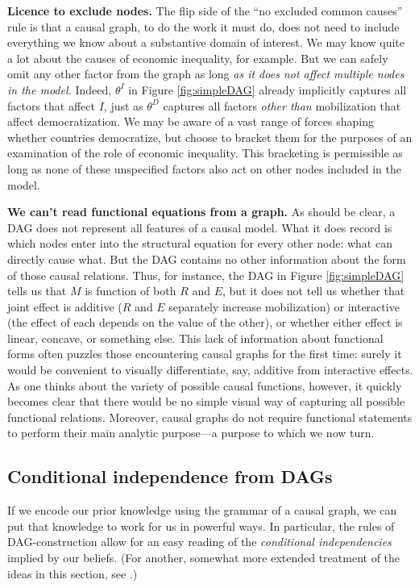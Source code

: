 \documentclass[
  12pt,
]{book}
\begin{document}
\textbf{Licence to exclude nodes.} The flip side of the ``no excluded common causes'' rule is that a causal graph, to do the work it must do, does not need to include everything we know about a substantive domain of interest. We may know quite a lot about the causes of economic inequality, for example. But we can safely omit any other factor from the graph as long \emph{as it does not affect multiple nodes in the model.} Indeed, \(\theta^I\) in Figure \ref{fig:simpleDAG} already implicitly captures all factors that affect \(I\), just as \(\theta^D\) captures all factors \emph{other than} mobilization that affect democratization. We may be aware of a vast range of forces shaping whether countries democratize, but choose to bracket them for the purposes of an examination of the role of economic inequality. This bracketing is permissible as long as none of these unspecified factors also act on other nodes included in the model.

\textbf{We can't read functional equations from a graph.} As should be clear, a DAG does not represent all features of a causal model. What it does record is which nodes enter into the structural equation for every other node: what can directly cause what. But the DAG contains no other information about the form of those causal relations. Thus, for instance, the DAG in Figure \ref{fig:simpleDAG} tells us that \(M\) is function of both \(R\) and \(E\), but it does not tell us whether that joint effect is additive (\(R\) and \(E\) separately increase mobilization) or interactive (the effect of each depends on the value of the other), or whether either effect is linear, concave, or something else. This lack of information about functional forms often puzzles those encountering causal graphs for the first time: surely it would be convenient to visually differentiate, say, additive from interactive effects. As one thinks about the variety of possible causal functions, however, it quickly becomes clear that there would be no simple visual way of capturing all possible functional relations. Moreover, causal graphs do not require functional statements to perform their main analytic purpose---a purpose to which we now turn.

\hypertarget{conditional-independence-from-dags}{%
\subsection{Conditional independence from DAGs}\label{conditional-independence-from-dags}}

If we encode our prior knowledge using the grammar of a causal graph, we can put that knowledge to work for us in powerful ways. In particular, the rules of DAG-construction allow for an easy reading of the \emph{conditional independencies} implied by our beliefs. (For another, somewhat more extended treatment of the ideas in this section, see \citet{rohrer2018thinking}.)
\end{document}
